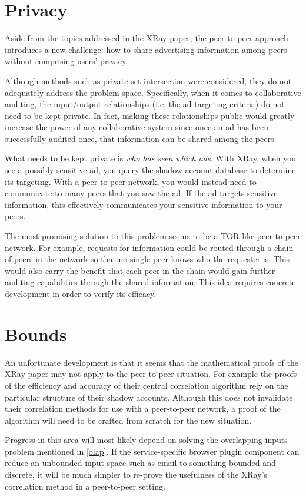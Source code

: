 \documentclass{article}
\begin{document}
\section{Privacy}

Aside from the topics addressed in the XRay paper, the peer-to-peer approach
introduces a new challenge: how to share advertising information among peers
without comprising users' privacy.

Although methods such as private set intersection were considered, they do not
adequately address the problem space. Specifically, when it comes to
collaborative auditing, the input/output relationships (i.e. the ad targeting
criteria) do not need to be kept private. In fact, making these relationships
public would greatly increase the power of any collaborative system since once
an ad has been successfully audited once, that information can be shared among
the peers.

What needs to be kept private is {\it who has seen which ads}. With XRay, when
you see a possibly sensitive ad, you query the shadow account database to
determine its targeting. With a peer-to-peer network, you would instead need to
communicate to many peers that you saw the ad. If the ad targets sensitive
information, this effectively communicates your sensitive information to your
peers.

The most promising solution to this problem seems to be a TOR-like peer-to-peer
network. For example, requests for information could be routed through a chain
of peers in the network so that no single peer knows who the requester is. This
would also carry the benefit that each peer in the chain would gain further
auditing capabilities through the shared information. This idea requires
concrete development in order to verify its efficacy.

\section{Bounds}

An unfortunate development is that it seems that the mathematical proofs of the
XRay paper may not apply to the peer-to-peer situation. For example the proofs
of the efficiency and accuracy of their central correlation algorithm rely on
the particular structure of their shadow accounts. Although this does not
invalidate their correlation methods for use with a peer-to-peer network, a
proof of the algorithm will need to be crafted from scratch for the new
situation.

Progress in this area will most likely depend on solving the overlapping inputs
problem mentioned in \ref{olap}. If the service-specific browser plugin
component can reduce an unbounded input space such as email to something bounded
and discrete, it will be much simpler to re-prove the usefulness of the XRay's
correlation method in a peer-to-peer setting.
\end{document}
